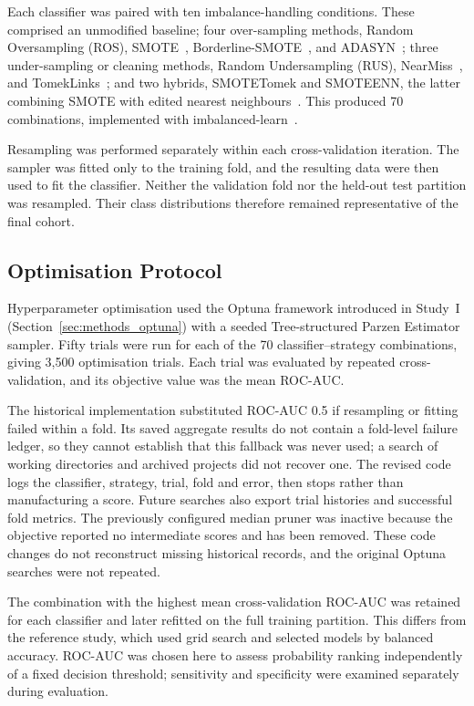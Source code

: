 Each classifier was paired with ten imbalance-handling conditions. These comprised an unmodified baseline; four over-sampling methods, Random Oversampling (\gls{ROS}), \gls{SMOTE}~\cite{chawla2002smote}, Borderline-SMOTE~\cite{han2005borderline}, and \gls{ADASYN}~\cite{he2008adasyn}; three under-sampling or cleaning methods, Random Undersampling (\gls{RUS}), NearMiss~\cite{zhang2003nearmiss}, and TomekLinks~\cite{tomek1976cnn}; and two hybrids, \gls{SMOTETomek} and \gls{SMOTEENN}, the latter combining SMOTE with edited nearest neighbours~\cite{wilson1972edited}. This produced 70 combinations, implemented with imbalanced-learn~\cite{lemaitre2017}.

Resampling was performed separately within each cross-validation iteration. The sampler was fitted only to the training fold, and the resulting data were then used to fit the classifier. Neither the validation fold nor the held-out test partition was resampled. Their class distributions therefore remained representative of the final cohort.

\subsection{Optimisation Protocol}
\label{subsec:s2_optuna}

Hyperparameter optimisation used the Optuna framework introduced in Study~I (Section~\ref{sec:methods_optuna}) with a seeded Tree-structured Parzen Estimator sampler. Fifty trials were run for each of the 70 classifier--strategy combinations, giving 3,500 optimisation trials. Each trial was evaluated by repeated cross-validation, and its objective value was the mean \gls{ROC-AUC}.

The historical implementation substituted ROC-AUC 0.5 if resampling or fitting failed within a fold. Its saved aggregate results do not contain a fold-level failure ledger, so they cannot establish that this fallback was never used; a search of working directories and archived projects did not recover one. The revised code logs the classifier, strategy, trial, fold and error, then stops rather than manufacturing a score. Future searches also export trial histories and successful fold metrics. The previously configured median pruner was inactive because the objective reported no intermediate scores and has been removed. These code changes do not reconstruct missing historical records, and the original Optuna searches were not repeated.

The combination with the highest mean cross-validation ROC-AUC was retained for each classifier and later refitted on the full training partition. This differs from the reference study, which used grid search and selected models by balanced accuracy. ROC-AUC was chosen here to assess probability ranking independently of a fixed decision threshold; sensitivity and specificity were examined separately during evaluation.

